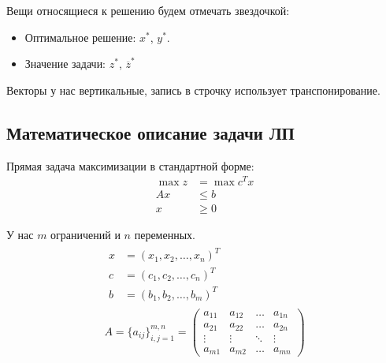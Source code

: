 \documentclass[a4paper,article,14pt]{extarticle}
\begin{document}
Вещи относящиеся к решению будем отмечать звездочкой:

\begin{itemize}
    \item Оптимальное решение: \(x^*\), \(y^*\).
    \item Значение задачи: \(z^*\), \(\overline z^*\)
\end{itemize}

Векторы у нас вертикальные, запись в строчку использует транспонирование.

\subsection{Математическое описание задачи ЛП}

Прямая задача максимизации в стандартной форме:
\begin{equation} \label{eq:primal_max}
    \begin{aligned}
        \max z & = \max c^Tx \\
        Ax & \le b \\
        x & \ge 0
    \end{aligned}
\end{equation}


У нас \(m\) ограничений и \(n\) переменных.
\begin{equation}
    \begin{gathered}
        \begin{aligned}
            x & = (x_1, x_2, \ldots, x_n)^T \\
            c & = (c_1, c_2, \ldots, c_n)^T \\
            b & = (b_1, b_2, \ldots, b_m)^T
        \end{aligned} \\
        A
        = \{a_{ij}\}_{i,j = 1}^{m,n}
        =
        \begin{pmatrix}
            a_{11} & a_{12} & \ldots & a_{1n} \\
            a_{21} & a_{22} & \ldots & a_{2n} \\
            \vdots & \vdots & \ddots & \vdots \\
            a_{m1} & a_{m2} & \ldots & a_{mn}
        \end{pmatrix}
    \end{gathered}
\end{equation}
\end{document}
